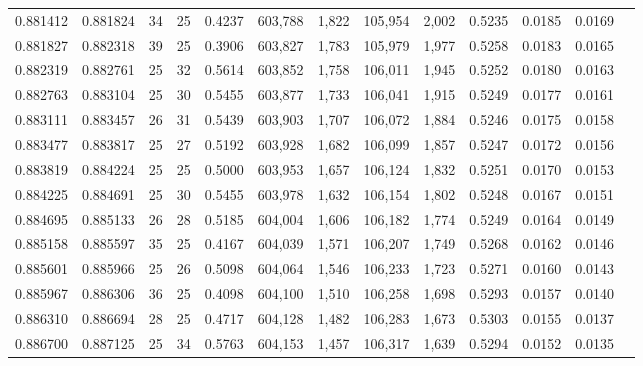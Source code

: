 \begin{tabular}{rrrrrrrrrrrrr}
0.881412 & 0.881824 &    34 &  25 &                                     0.4237 & 603,788 &   1,822 & 105,954 &   2,002 & 0.5235 & 0.0185 & 0.0169 \\
0.881827 & 0.882318 &    39 &  25 &                                     0.3906 & 603,827 &   1,783 & 105,979 &   1,977 & 0.5258 & 0.0183 & 0.0165 \\
0.882319 & 0.882761 &    25 &  32 &                                     0.5614 & 603,852 &   1,758 & 106,011 &   1,945 & 0.5252 & 0.0180 & 0.0163 \\
0.882763 & 0.883104 &    25 &  30 &                                     0.5455 & 603,877 &   1,733 & 106,041 &   1,915 & 0.5249 & 0.0177 & 0.0161 \\
0.883111 & 0.883457 &    26 &  31 &                                     0.5439 & 603,903 &   1,707 & 106,072 &   1,884 & 0.5246 & 0.0175 & 0.0158 \\
0.883477 & 0.883817 &    25 &  27 &                                     0.5192 & 603,928 &   1,682 & 106,099 &   1,857 & 0.5247 & 0.0172 & 0.0156 \\
0.883819 & 0.884224 &    25 &  25 &                                     0.5000 & 603,953 &   1,657 & 106,124 &   1,832 & 0.5251 & 0.0170 & 0.0153 \\
0.884225 & 0.884691 &    25 &  30 &                                     0.5455 & 603,978 &   1,632 & 106,154 &   1,802 & 0.5248 & 0.0167 & 0.0151 \\
0.884695 & 0.885133 &    26 &  28 &                                     0.5185 & 604,004 &   1,606 & 106,182 &   1,774 & 0.5249 & 0.0164 & 0.0149 \\
0.885158 & 0.885597 &    35 &  25 &                                     0.4167 & 604,039 &   1,571 & 106,207 &   1,749 & 0.5268 & 0.0162 & 0.0146 \\
0.885601 & 0.885966 &    25 &  26 &                                     0.5098 & 604,064 &   1,546 & 106,233 &   1,723 & 0.5271 & 0.0160 & 0.0143 \\
0.885967 & 0.886306 &    36 &  25 &                                     0.4098 & 604,100 &   1,510 & 106,258 &   1,698 & 0.5293 & 0.0157 & 0.0140 \\
0.886310 & 0.886694 &    28 &  25 &                                     0.4717 & 604,128 &   1,482 & 106,283 &   1,673 & 0.5303 & 0.0155 & 0.0137 \\
0.886700 & 0.887125 &    25 &  34 &                                     0.5763 & 604,153 &   1,457 & 106,317 &   1,639 & 0.5294 & 0.0152 & 0.0135 \\

\end{tabular}
